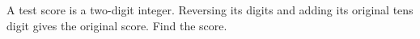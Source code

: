 A test score is a two-digit integer. Reversing its digits and adding its original tens digit gives the original score. Find the score.
